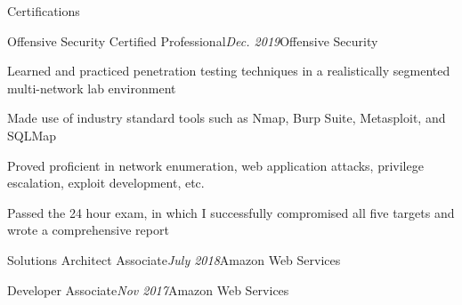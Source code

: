 \documentclass{resume} %
\begin{document}
\begin{rSection}{\vspace{-5pt}Certifications}
  \begin{rSubsection}{Offensive Security Certified Professional}{\em Dec. 2019}{Offensive Security}{}
  \item {Learned and practiced penetration testing techniques in a realistically segmented multi-network lab environment}
  \item {Made use of industry standard tools such as Nmap, Burp Suite, Metasploit, and SQLMap }
  \item {Proved proficient in network enumeration, web application attacks, privilege escalation, exploit development, etc.}
  \item {Passed the 24 hour exam, in which I successfully compromised all five targets and wrote a comprehensive report}
  \end{rSubsection}
  \begin{rSubsection}{Solutions Architect Associate}{\em July 2018}{Amazon Web Services}{}
  \end{rSubsection}
  \begin{rSubsection}{Developer Associate}{\em Nov 2017}{Amazon Web Services}{}
  \end{rSubsection}
\end{rSection}
\end{document}
